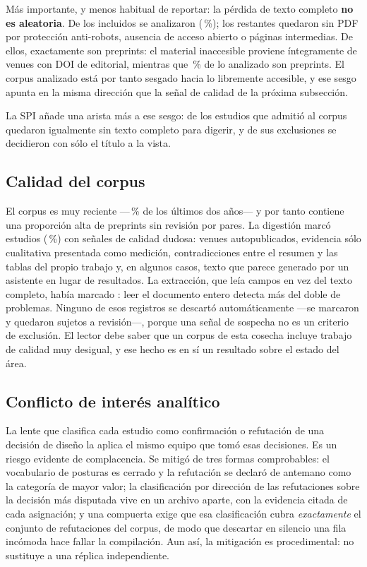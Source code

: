 \documentclass[conference]{IEEEtran}
\begin{document}
Más importante, y menos habitual de reportar: la pérdida de texto completo \textbf{no es aleatoria}.
De los \clSelIncluidosTotal{} incluidos se analizaron \clSelConTexto{} (\clSelCobertura{}\,\%); los
\clSelSinTexto{} restantes quedaron sin PDF por protección anti-robots, ausencia de acceso abierto o
páginas intermedias. De ellos, exactamente \clAmeSinTextoPreprint{} son preprints: el material
inaccesible proviene íntegramente de venues con DOI de editorial, mientras que
\clAmeAnalizadosPreprint{}\,\% de lo analizado son preprints. El corpus analizado está por tanto
sesgado hacia lo libremente accesible, y ese sesgo apunta en la misma dirección que la señal de
calidad de la próxima subsección.

La SPI añade una arista más a ese sesgo: \clPostBloqueadosSinTexto{} de los estudios que admitió al
corpus quedaron igualmente sin texto completo para digerir, y \clPostExclusionesSoloTitulo{} de sus
exclusiones se decidieron con sólo el título a la vista.

\subsection{Calidad del corpus}

El corpus es muy reciente —\clCarRecientesPct{}\,\% de los últimos dos años— y por tanto contiene una
proporción alta de preprints sin revisión por pares. La digestión marcó \clCalReconsiderarDig{}
estudios (\clCalReconsiderarDigPct{}\,\%) con señales de calidad dudosa: venues autopublicados,
evidencia sólo cualitativa presentada como medición, contradicciones entre el resumen y las tablas
del propio trabajo y, en algunos casos, texto que parece generado por un asistente en lugar de
resultados. La extracción, que leía campos en vez del texto completo, había marcado
\clCalReconsiderarExt{}: leer el documento entero detecta más del doble de problemas. Ninguno de esos
registros se descartó automáticamente —se marcaron y quedaron sujetos a revisión—, porque una señal
de sospecha no es un criterio de exclusión. El lector debe saber que un corpus de esta cosecha
incluye trabajo de calidad muy desigual, y ese hecho es en sí un resultado sobre el estado del área.

\subsection{Conflicto de interés analítico}

La lente que clasifica cada estudio como confirmación o refutación de una decisión de diseño la
aplica el mismo equipo que tomó esas decisiones. Es un riesgo evidente de complacencia. Se mitigó de
tres formas comprobables: el vocabulario de posturas es cerrado y la refutación se declaró de
antemano como la categoría de mayor valor; la clasificación por dirección de las refutaciones sobre
la decisión más disputada vive en un archivo aparte, con la evidencia citada de cada asignación; y
una compuerta exige que esa clasificación cubra \emph{exactamente} el conjunto de refutaciones del
corpus, de modo que descartar en silencio una fila incómoda hace fallar la compilación. Aun así, la
mitigación es procedimental: no sustituye a una réplica independiente.
\end{document}
